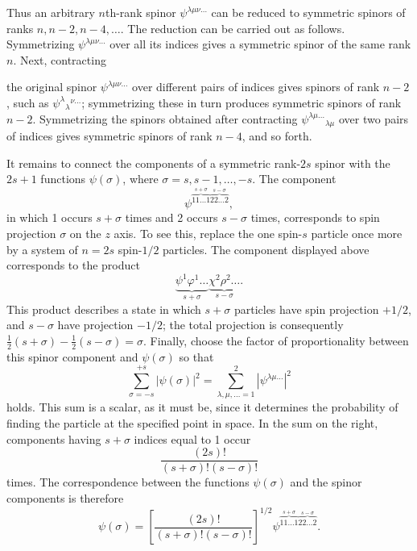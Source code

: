 Thus an arbitrary $n$th-rank spinor $\psi^{\lambda\mu\nu\ldots}$ can be
reduced to symmetric spinors of ranks $n,n-2,n-4,\ldots$. The reduction can
be carried out as follows. Symmetrizing $\psi^{\lambda\mu\nu\ldots}$ over all
its indices gives a symmetric spinor of the same rank $n$. Next, contracting

the original spinor $\psi^{\lambda\mu\nu\ldots}$ over different pairs of
indices gives spinors of rank $n-2$, such as
$\psi^\lambda{}_{\lambda}{}^{\nu\ldots}$; symmetrizing these in turn produces
symmetric spinors of rank $n-2$. Symmetrizing the spinors obtained after
contracting $\psi^{\lambda\mu\ldots}{}_{\lambda\mu}$ over two pairs of
indices gives symmetric spinors of rank $n-4$, and so forth.

It remains to connect the components of a symmetric rank-$2s$ spinor with the
$2s+1$ functions $\psi(\sigma)$, where
$\sigma=s,s-1,\ldots,-s$. The component
\[
 \psi^{\overbrace{11\ldots1}^{s+\sigma}
              \overbrace{22\ldots2}^{s-\sigma}},
\]
in which 1 occurs $s+\sigma$ times and 2 occurs $s-\sigma$ times,
corresponds to spin projection $\sigma$ on the $z$ axis. To see this, replace
the one spin-$s$ particle once more by a system of $n=2s$ spin-$1/2$
particles. The component displayed above corresponds to the product
\[
 \underbrace{\psi^1\varphi^1\ldots}_{s+\sigma}
 \underbrace{\chi^2\rho^2\ldots}_{s-\sigma}.
\]
This product describes a state in which $s+\sigma$ particles have spin
projection $+1/2$, and $s-\sigma$ have projection $-1/2$; the total
projection is consequently
$\frac12(s+\sigma)-\frac12(s-\sigma)=\sigma$. Finally, choose the factor of
proportionality between this spinor component and $\psi(\sigma)$ so that
\begin{equation}
 \sum_{\sigma=-s}^{+s}|\psi(\sigma)|^2
 =\sum_{\lambda,\mu,\ldots=1}^{2}|\psi^{\lambda\mu\ldots}|^2
 \tag{57.1}
\end{equation}
holds. This sum is a scalar, as it must be, since it determines the probability
of finding the particle at the specified point in space. In the sum on the
right, components having $s+\sigma$ indices equal to 1 occur
\[
 \frac{(2s)!}{(s+\sigma)!(s-\sigma)!}
\]
times. The correspondence between the functions $\psi(\sigma)$ and the
spinor components is therefore
\begin{equation}
 \psi(\sigma)=\left[\frac{(2s)!}{(s+\sigma)!(s-\sigma)!}\right]^{1/2}
 \psi^{\overbrace{11\ldots1}^{s+\sigma}
       \overbrace{22\ldots2}^{s-\sigma}}.
 \tag{57.2}
\end{equation}


